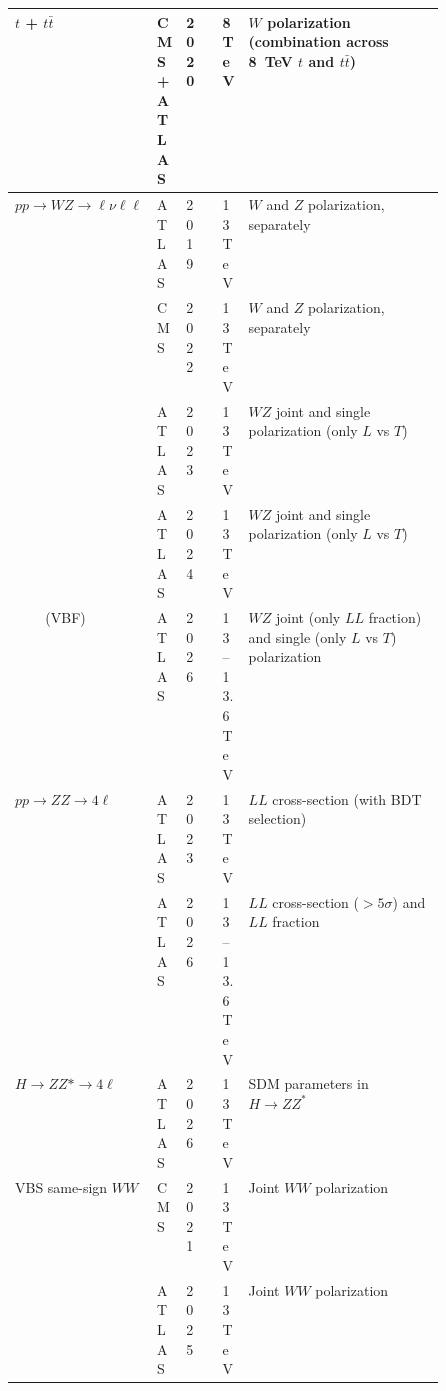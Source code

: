 \begin{landscape}
{\begin{longtable}{@{}lllll>{\raggedright\arraybackslash}p{0.5\linewidth}@{}}
        \midrule
        $t$ + $t\bar{t}$ & CMS+ATLAS & 2020 & \cite{CMS:2020ezf} & 8\,TeV & $W$ polarization (combination across 8~TeV $t$ and $t\bar{t}$) \\
        \midrule
        $pp \to WZ \to \ell\nu\ell\ell$ & ATLAS & 2019 & \cite{ATLAS:2019bsc} & 13\,TeV & $W$ and $Z$ polarization, separately \\
        & CMS & 2022 & \cite{CMS:2021icx} & 13\,TeV & $W$ and $Z$ polarization, separately \\
        & ATLAS & 2023 & \cite{ATLAS:2022oge} & 13\,TeV & $WZ$ joint and single polarization (only $L$ vs $T$) \\
        & ATLAS & 2024 & \cite{ATLAS:2024qbd} & 13\,TeV & $WZ$ joint and single polarization (only $L$ vs $T$) \\
        \,\,\,\,\,\,\,\,\,\,\,\,\,(VBF) & ATLAS & 2026 & \cite{ATLAS:2026kzu} & 13--13.6\,TeV & $WZ$ joint (only $LL$ fraction) and single (only $L$ vs $T$) polarization  \\
        \midrule
        $pp \to ZZ \to 4\ell$ & ATLAS & 2023 & \cite{ATLAS:2023zrv} & 13\,TeV & $LL$ cross-section (with BDT selection) \\
        & ATLAS & 2026 & \cite{ATLAS:2026fhf} & 13--13.6\,TeV & $LL$ cross-section ($>5\sigma$) and $LL$ fraction \\
        \midrule
        $H \to ZZ*\to4\ell$ & ATLAS & 2026 & \cite{ATLAS:2026hye} & 13\,TeV & SDM parameters in $H \to ZZ^*$ \\
        \midrule
        VBS same-sign $WW$ & CMS & 2021 & \cite{CMS:2020etf} & 13\,TeV & Joint $WW$ polarization \\
        & ATLAS & 2025 & \cite{ATLAS:2025wuw} & 13\,TeV & Joint $WW$ polarization \\
\end{longtable}
}
\end{landscape}
